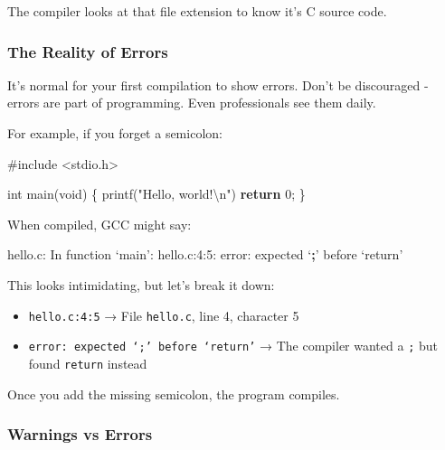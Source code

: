 \documentclass[
  letterpaper,
  DIV=11,
  numbers=noendperiod]{scrreprt}
\newenvironment{Shaded}{\begin{snugshade}}{\end{snugshade}}
\newcommand{\ControlFlowTok}[1]{\textcolor[rgb]{0.00,0.23,0.31}{\textbf{#1}}}
\newcommand{\DataTypeTok}[1]{\textcolor[rgb]{0.68,0.00,0.00}{#1}}
\newcommand{\DecValTok}[1]{\textcolor[rgb]{0.68,0.00,0.00}{#1}}
\newcommand{\ExtensionTok}[1]{\textcolor[rgb]{0.00,0.23,0.31}{#1}}
\newcommand{\ImportTok}[1]{\textcolor[rgb]{0.00,0.46,0.62}{#1}}
\newcommand{\KeywordTok}[1]{\textcolor[rgb]{0.00,0.23,0.31}{\textbf{#1}}}
\newcommand{\NormalTok}[1]{\textcolor[rgb]{0.00,0.23,0.31}{#1}}
\newcommand{\OperatorTok}[1]{\textcolor[rgb]{0.37,0.37,0.37}{#1}}
\newcommand{\PreprocessorTok}[1]{\textcolor[rgb]{0.68,0.00,0.00}{#1}}
\newcommand{\SpecialCharTok}[1]{\textcolor[rgb]{0.37,0.37,0.37}{#1}}
\newcommand{\StringTok}[1]{\textcolor[rgb]{0.13,0.47,0.30}{#1}}
\providecommand{\tightlist}{%
  \setlength{\itemsep}{0pt}\setlength{\parskip}{0pt}}
\begin{document}
The compiler looks at that file extension to know it's C source code.

\subsubsection{The Reality of Errors}\label{the-reality-of-errors}

It's normal for your first compilation to show errors. Don't be
discouraged - errors are part of programming. Even professionals see
them daily.

For example, if you forget a semicolon:

\begin{Shaded}
\begin{Highlighting}[]
\PreprocessorTok{\#include }\ImportTok{\textless{}stdio.h\textgreater{}}

\DataTypeTok{int}\NormalTok{ main}\OperatorTok{(}\DataTypeTok{void}\OperatorTok{)} \OperatorTok{\{}
\NormalTok{    printf}\OperatorTok{(}\StringTok{"Hello, world!}\SpecialCharTok{\textbackslash{}n}\StringTok{"}\OperatorTok{)}
    \ControlFlowTok{return} \DecValTok{0}\OperatorTok{;}
\OperatorTok{\}}
\end{Highlighting}
\end{Shaded}

When compiled, GCC might say:

\begin{Shaded}
\begin{Highlighting}[]
\ExtensionTok{hello.c:}\NormalTok{ In function ‘main’:}
\ExtensionTok{hello.c:4:5:}\NormalTok{ error: expected ‘}\KeywordTok{;}\ExtensionTok{’}\NormalTok{ before ‘return’}
\end{Highlighting}
\end{Shaded}

This looks intimidating, but let's break it down:

\begin{itemize}
\tightlist
\item
  \texttt{hello.c:4:5} → File \texttt{hello.c}, line 4, character 5
\item
  \texttt{error:\ expected\ ‘;’\ before\ ‘return’} → The compiler wanted
  a \texttt{;} but found \texttt{return} instead
\end{itemize}

Once you add the missing semicolon, the program compiles.

\subsubsection{Warnings vs Errors}\label{warnings-vs-errors}
\end{document}
